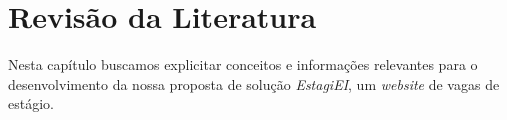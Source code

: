 \chapter{Revisão da Literatura}
Nesta capítulo buscamos explicitar conceitos e informações relevantes para o desenvolvimento da nossa proposta de solução \emph{EstagiEI}, um \emph{website} de vagas de estágio.
\begin{comment}
Todos trabalhos devem possuir a revisão de literatura onde são abordados os estudos feitos com base da literatura (livros, artigos acadêmicos, publicações em periódicos), todos elementos devem ser referenciados por citações.

Diversas referencias utilizadas nesse modelo não deveriam ser utilizadas diretamente em um trabalho acadêmico, mas estão aqui para demonstrar de forma mais clara alguns pontos importantes sobre desenvolvimento de projetos

Cada parágrafo da revisão de literatura deve apresentar uma ideia com base em uma referencia 

Copiar e colocar é plágio. Exceto em casos muito específicos onde utilizamos a citação direta você deve escrever com suas palavras (seu entendimento, parafrasear) o que os autores escreveram na publicação original

Não são abordados aqui itens técnicos que normalmente são vistos em disciplinas anteriores do curso (UML, banco de dados, metodologias de gerenciamento de projeto etc...), esses elementos podem receber citações nos outros capítulos do trabalho. Essa regra não se aplica aos trabalhos de pós graduação quando o tema estiver relacionado a conceitos técnicos.

\end{comment}











